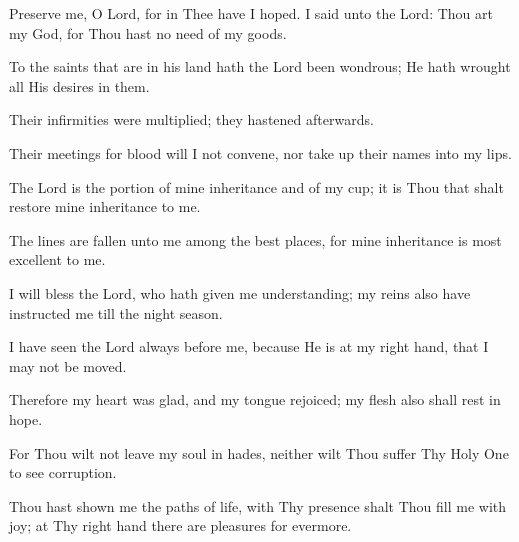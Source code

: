 Preserve me, O Lord, for in Thee have I hoped. I said unto the Lord: Thou art my God, for Thou hast no need of my goods.

To the saints that are in his land hath the Lord been wondrous; He hath wrought all His desires in them.

Their infirmities were multiplied; they hastened afterwards.

Their meetings for blood will I not convene, nor take up their names into my lips.

The Lord is the portion of mine inheritance and of my cup; it is Thou that shalt restore mine inheritance to me.

The lines are fallen unto me among the best places, for mine inheritance is most excellent to me.

I will bless the Lord, who hath given me understanding; my reins also have instructed me till the night season.

I have seen the Lord always before me, because He is at my right hand, that I may not be moved.

Therefore my heart was glad, and my tongue rejoiced; my flesh also shall rest in hope.

For Thou wilt not leave my soul in hades, neither wilt Thou suffer Thy Holy One to see corruption.

Thou hast shown me the paths of life, with Thy presence shalt Thou fill me with joy; at Thy right hand there are pleasures for evermore.
